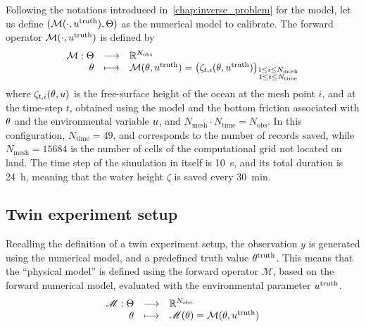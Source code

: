 \documentclass[../../Main_ManuscritThese.tex]{subfiles}
\begin{document}
Following the notations introduced in~\cref{chap:inverse_problem} for
the model, let us define
$(\mathcal{M}(\cdot,u^{\mathrm{truth}}),\Theta)$ as the numerical
model to calibrate. The forward operator
$\mathcal{M}(\cdot, u^{\mathrm{truth}})$ is defined by
\begin{equation}
  \begin{array}{rcl}
    \mathcal{M}: \Theta  &\longrightarrow& \mathbb{R}^{N_{\mathrm{obs}}} \\
    \theta & \longmapsto & \mathcal{M}(\theta, u^{\mathrm{truth}}) = \left(\zeta_{t,i}(\theta, u^{\mathrm{truth}})\right)_{\substack{1 \leq i \leq N_{\mathrm{mesh}} \\ 1 \leq t \leq N_{\mathrm{time}}}} \\ 
  \end{array}
\end{equation}
where $\zeta_{t,i}(\theta,u)$ is the free-surface height of the ocean
at the mesh point $i$, and at the time-step $t$, obtained using the
model and the bottom friction associated with $\theta$ and the
environmental variable $u$, and
$N_{\mathrm{mesh}} \cdot N_{\mathrm{time}} = N_{\mathrm{obs}}$. In this configuration,
$N_{\mathrm{time}} =\num{49}$, and corresponds to the number of
records saved, while $N_{\mathrm{mesh}}=\num{15684}$ is the number of
cells of the computational grid not located on land. The time step of
the simulation in itself is \SI{10}{\second}, and its total duration
is \SI{24}{\hour}, meaning that the water height $\zeta$ is saved
every \SI{30}{\minute}.

\subsection{Twin experiment setup}
Recalling the definition of a twin experiment setup, the observation
$y$ is generated using the numerical model, and a predefined truth
value $\theta^{\mathrm{truth}}$.  This means that the ``physical model''
is defined using the forward operator $\mathscr{M}$, based on the
forward numerical model, evaluated with the environmental parameter
$u^{\mathrm{truth}}$.
\begin{equation}
  \label{eq:twin_exp}
  \begin{array}{rcl}
    \mathscr{M}: \Theta &\longrightarrow & \mathbb{R}^{N_{\mathrm{obs}}} \\
    \theta & \longmapsto &\mathscr{M}(\theta) = \mathcal{M}(\theta, u^{\mathrm{truth}})
  \end{array}
\end{equation}
\end{document}
